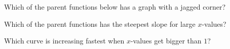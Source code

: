 \documentclass{ximera}
\begin{document}
\begin{question}
Which of the parent functions below has a graph with a jagged corner?

\begin{multipleChoice}
\end{multipleChoice}

\end{question}

\begin{question}
Which of the parent functions has the steepest slope for large $x$-values?

\begin{hint}
Which curve is increasing fastest when $x$-values get bigger than $1$?
\end{hint}
\begin{multipleChoice}
\end{multipleChoice}

\end{question}
\end{document}
